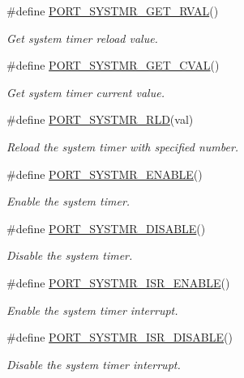 \begin{DoxyCompactItemize}
$$\#define \hyperlink{group__template__cpu__intf_ga148b9eebb96ac28f7e84b94602d3b971}{P\-O\-R\-T\-\_\-\-S\-Y\-S\-T\-M\-R\-\_\-\-G\-E\-T\-\_\-\-R\-V\-A\-L}()
\begin{DoxyCompactList}\small\item\em Get system timer reload value. \end{DoxyCompactList}\item 
\#define \hyperlink{group__template__cpu__intf_gacf78b07f0013cd7a1d06b258e37016e3}{P\-O\-R\-T\-\_\-\-S\-Y\-S\-T\-M\-R\-\_\-\-G\-E\-T\-\_\-\-C\-V\-A\-L}()
\begin{DoxyCompactList}\small\item\em Get system timer current value. \end{DoxyCompactList}\item 
\#define \hyperlink{group__template__cpu__intf_ga978c719faf8d3026aa9714561e8cd522}{P\-O\-R\-T\-\_\-\-S\-Y\-S\-T\-M\-R\-\_\-\-R\-L\-D}(val)
\begin{DoxyCompactList}\small\item\em Reload the system timer with specified number. \end{DoxyCompactList}\item 
\#define \hyperlink{group__template__cpu__intf_ga566d86ffb8459153b9bc95a7d9dfb8ca}{P\-O\-R\-T\-\_\-\-S\-Y\-S\-T\-M\-R\-\_\-\-E\-N\-A\-B\-L\-E}()
\begin{DoxyCompactList}\small\item\em Enable the system timer. \end{DoxyCompactList}\item 
\#define \hyperlink{group__template__cpu__intf_ga2a361d660165aff766184242c274fe40}{P\-O\-R\-T\-\_\-\-S\-Y\-S\-T\-M\-R\-\_\-\-D\-I\-S\-A\-B\-L\-E}()
\begin{DoxyCompactList}\small\item\em Disable the system timer. \end{DoxyCompactList}\item 
\#define \hyperlink{group__template__cpu__intf_ga3863363d274eeebcf2ad0a3887068e87}{P\-O\-R\-T\-\_\-\-S\-Y\-S\-T\-M\-R\-\_\-\-I\-S\-R\-\_\-\-E\-N\-A\-B\-L\-E}()
\begin{DoxyCompactList}\small\item\em Enable the system timer interrupt. \end{DoxyCompactList}\item 
\#define \hyperlink{group__template__cpu__intf_gac2054b84d008e800a13b0e25f93e2dd9}{P\-O\-R\-T\-\_\-\-S\-Y\-S\-T\-M\-R\-\_\-\-I\-S\-R\-\_\-\-D\-I\-S\-A\-B\-L\-E}()
\begin{DoxyCompactList}\small\item\em Disable the system timer interrupt. \end{DoxyCompactList}\end{DoxyCompactItemize}
